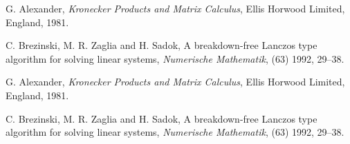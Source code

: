 \documentclass[11pt,a4paper]{ctexart}
\begin{document}
\begin{thebibliography}{99}

\newblock G. Alexander,
\newblock \emph{Kronecker Products and Matrix Calculus},
\newblock Ellis Horwood Limited, England, 1981.

\newblock C. Brezinski, M. R. Zaglia and H. Sadok,
\newblock A breakdown-free Lanczos type algorithm for solving linear systems,
\newblock \emph{Numerische Mathematik}, (63) 1992, 29--38.

\newblock G. Alexander,
\newblock \emph{Kronecker Products and Matrix Calculus},
\newblock Ellis Horwood Limited, England, 1981.

\newblock C. Brezinski, M. R. Zaglia and H. Sadok,
\newblock A breakdown-free Lanczos type algorithm for solving linear systems,
\newblock \emph{Numerische Mathematik}, (63) 1992, 29--38.

\end{thebibliography}
\end{document}
